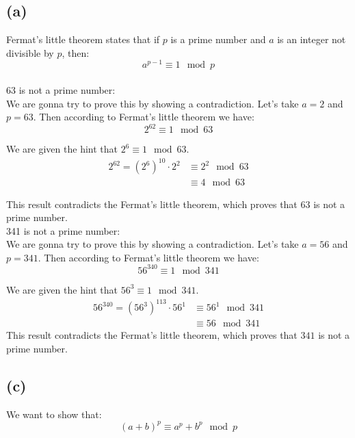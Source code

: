 \documentclass{article}
\begin{document}
\subsection*{(a)}


Fermat's little theorem states that if \(p\) is a prime number and \(a\) is an integer not divisible by \(p\), then:
\[
   a^{p-1} \equiv 1 \mod p
\]
\\
63 is not a prime number: \\
We are gonna try to prove this by showing a contradiction. Let's take \(a = 2\) and \(p = 63\).
Then according to Fermat's little theorem we have:
\[
   2^{62} \equiv 1 \mod 63
\]

We are given the hint that \(2^6 \equiv 1 \mod 63\).
\begin{align*}
   2^{62} = (2^6)^{10} \cdot 2^2 &\equiv 2^2 \mod 63 \\
                                 &\equiv 4 \mod 63
\end{align*}

This result contradicts the Fermat's little theorem, which proves that \(63\) is not a prime number.
\\
341 is not a prime number: \\
We are gonna try to prove this by showing a contradiction. Let's take \(a = 56\) and \(p = 341\).
Then according to Fermat's little theorem we have:
\[
   56^{340} \equiv 1 \mod 341
\]

We are given the hint that \(56^3 \equiv 1 \mod 341\).
\begin{align*}
   56^{340} = (56^3)^{113} \cdot 56^1 &\equiv 56^1 \mod 341 \\
                                       &\equiv 56 \mod 341
\end{align*}
This result contradicts the Fermat's little theorem, which proves that \(341\) is not a prime number.

\subsection*{(c)}


We want to show that:
\[
   (a + b)^p \equiv a^p + b^p \mod p
\]
\end{document}

